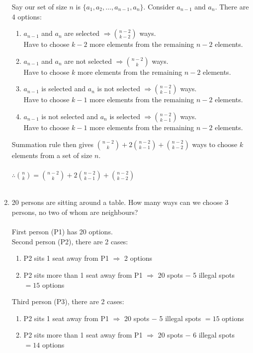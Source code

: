 \documentclass[10pt,a4paper,final]{article}
\begin{document}
\begin{enumerate}
Say our set of size $n$ is $\{a_1, a_2, \dots, a_{n-1}, a_n\}$.
Consider $a_{n-1}$ and $a_n$. There are 4 options:
\begin{enumerate}
\item $a_{n-1}$ and $a_n$ are selected $\Rightarrow \binom{n-2}{k-2}$ ways.\\
Have to choose $k-2$ more elements from the remaining $n-2$ elements.
\item $a_{n-1}$ and $a_n$ are not selected $\Rightarrow \binom{n-2}{k}$ ways.\\
Have to choose $k$ more elements from the remaining $n-2$ elements.
\item $a_{n-1}$ is selected and $a_n$ is not selected $\Rightarrow \binom{n-2}{k-1}$ ways.\\
Have to choose $k-1$ more elements from the remaining $n-2$ elements.
\item $a_{n-1}$ is not selected and $a_n$ is selected $\Rightarrow \binom{n-2}{k-1}$ ways.\\
Have to choose $k-1$ more elements from the remaining $n-2$ elements.
\end{enumerate}
Summation rule then gives
$\binom{n-2}{k} + 2 \binom{n-2}{k-1} + \binom{n-2}{k-2}$ ways to choose $k$ elements
from a set of size $n$.\\ \\
$\therefore \binom{n}{k} = \binom{n-2}{k} + 2 \binom{n-2}{k-1} + \binom{n-2}{k-2}$\\
\\
\item %
20 persons are sitting around a table.
How many ways can we choose 3 persons, no two of whom are neighbours?\\
\\
First person (P1) has 20 options. \\
Second person (P2), there are 2 cases:
\begin{enumerate}
\item P2 sits 1 seat away from P1 $\Rightarrow$ 2 options
\item P2 sits more than 1 seat away from P1 $\Rightarrow$ 20 spots $-$ 5 illegal spots $=15$ options
\end{enumerate}
Third person (P3), there are 2 cases:
\begin{enumerate}
\item P2 sits 1 seat away from P1 $\Rightarrow$ 20 spots $-$ 5 illegal spots $=15$ options
\item P2 sits more than 1 seat away from P1 $\Rightarrow$ 20 spots $-$ 6 illegal spots $=14$ options
\end{enumerate}


\end{enumerate}
\end{document}
